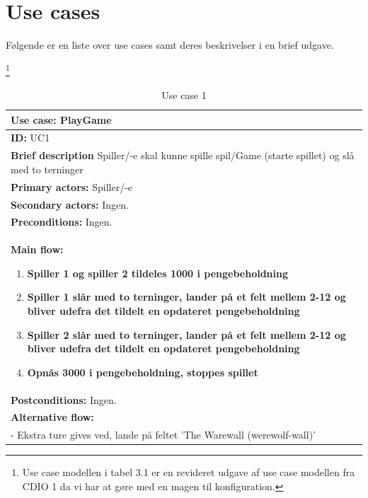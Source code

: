 \pagebreak

\section{Use cases}

Følgende er en liste over use cases samt deres beskrivelser i en brief udgave.

\footnote{Use case modellen i tabel 3.1 er en revideret udgave af use case modellen fra CDIO 1 da vi har at gøre med en magen til konfiguration.}

\begin{table}[H]
    \begin{center}
        \begin{tabular}{ | p{15cm} |}
            \hline
            \textbf{Use case:} PlayGame \\ \hline
            \textbf{ID:} UC1 \\ \hline
            \textbf{Brief description} Spiller/-e skal kunne spille spil/Game (starte spillet) og slå med to terninger     \\ \hline
            \textbf{Primary actors:} Spiller/-e \\ \hline
            \textbf{Secondary actors:} Ingen. \\ \hline
            \textbf{Preconditions:} Ingen.     \\ \hline
            \textbf{Main flow:}
            \begin{enumerate}
                \item \textbf{Spiller 1 og spiller 2 tildeles 1000 i pengebeholdning}
                \item \textbf{Spiller 1 slår med to terninger, lander på et felt mellem 2-12 og bliver udefra det tildelt en opdateret pengebeholdning}
                \item \textbf{Spiller 2 slår med to terninger, lander på et felt mellem 2-12 og bliver udefra det tildelt en opdateret pengebeholdning}
                \item \textbf{Opnås 3000 i pengebeholdning, stoppes spillet} 
            \end{enumerate} \\ \hline
            \textbf{Postconditions:} Ingen.\\ \hline
            \textbf{Alternative flow:}
            \\- Ekstra ture gives ved, lande på feltet 'The Warewall (werewolf-wall)' \\ \hline
            \hline
        \end{tabular}
        \caption{Use case 1}
        \label{usecase:1}
    \end{center}
\end{table}


